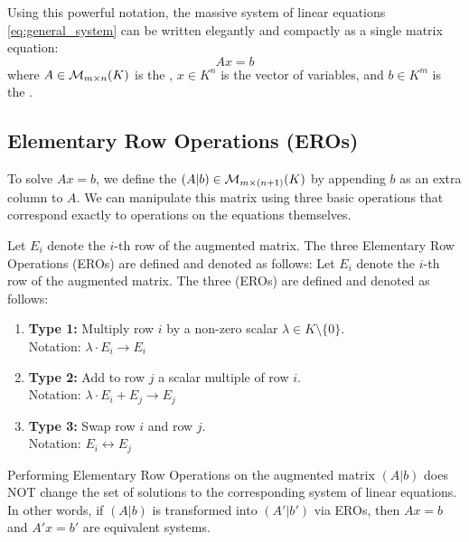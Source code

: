 Using this powerful notation, the massive system of linear equations \eqref{eq:general_system} can be written elegantly and compactly as a single matrix equation:
\begin{equation} \label{eq:matrix_equation}
A x = b
\end{equation}
where $A \in \mathcal{M}_{m \times n}(K)$ is the , $x \in K^n$ is the vector of variables, and $b \in K^m$ is the .

\subsection{Elementary Row Operations (EROs)}

To solve $A x = b$, we define the  $(A|b) \in \mathcal{M}_{m \times (n+1)}(K)$ by appending $b$ as an extra column to $A$. We can manipulate this matrix using three basic operations that correspond exactly to operations on the equations themselves.

\begin{definition}
Let $E_i$ denote the $i$-th row of the augmented matrix. The three Elementary Row Operations (EROs) are defined and denoted as follows:
Let $E_i$ denote the $i$-th row of the augmented matrix. The three  (EROs) are defined and denoted as follows:
\begin{enumerate}
    \item \textbf{Type 1:} Multiply row $i$ by a non-zero scalar $\lambda \in K \setminus \{0\}$. \\
    Notation: $\lambda \cdot E_i \to E_i$
    \item \textbf{Type 2:} Add to row $j$ a scalar multiple of row $i$. \\
    Notation: $\lambda \cdot E_i + E_j \to E_j$
    \item \textbf{Type 3:} Swap row $i$ and row $j$. \\
    Notation: $E_i \leftrightarrow E_j$
\end{enumerate}
\end{definition}

\begin{theorem}
Performing Elementary Row Operations on the augmented matrix $(A|b)$ does NOT change the set of solutions to the corresponding system of linear equations. In other words, if $(A|b)$ is transformed into $(A'|b')$ via EROs, then $Ax = b$ and $A'x = b'$ are equivalent systems.
\end{theorem}

